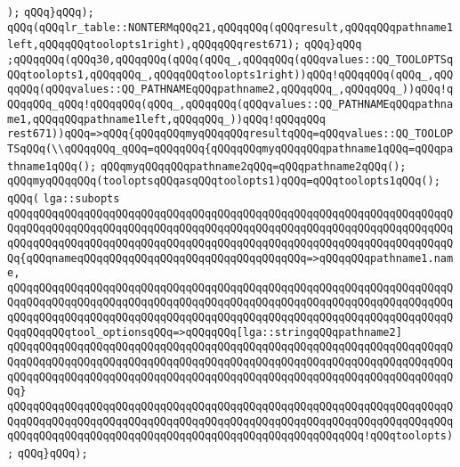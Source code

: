 \verb|);|\newline
\verb|qQQq}qQQq);|\newline
\verb|qQQq(qQQqlr_table::NONTERMqQQq21,qQQqqQQq(qQQqresult,qQQqqQQqpathname1left,qQQqqQQqtoolopts1right),qQQqqQQqrest671);|\newline
\verb|qQQq}qQQq|\newline
\verb|;qQQqqQQq(qQQq30,qQQqqQQq(qQQq(qQQq_,qQQqqQQq(qQQqvalues::QQ_TOOLOPTSqQQqtoolopts1,qQQqqQQq_,qQQqqQQqtoolopts1right))qQQq!qQQqqQQq(qQQq_,qQQqqQQq(qQQqvalues::QQ_PATHNAMEqQQqpathname2,qQQqqQQq_,qQQqqQQq_))qQQq!qQQqqQQq_qQQq!qQQqqQQq(qQQq_,qQQqqQQq(qQQqvalues::QQ_PATHNAMEqQQqpathname1,qQQqqQQqpathname1left,qQQqqQQq_))qQQq!qQQqqQQq|\newline
\verb|rest671))qQQq=>qQQq{qQQqqQQqmyqQQqqQQqresultqQQq=qQQqvalues::QQ_TOOLOPTSqQQq(\\qQQqqQQq_qQQq=qQQqqQQq{qQQqqQQqmyqQQqqQQqpathname1qQQq=qQQqpathname1qQQq();|\newline
\verb|qQQqmyqQQqqQQqpathname2qQQq=qQQqpathname2qQQq();|\newline
\verb|qQQqmyqQQqqQQq(tooloptsqQQqasqQQqtoolopts1)qQQq=qQQqtoolopts1qQQq();|\newline
\verb|qQQq(|\newline
\verb|lga::subopts|\newline
\verb|qQQqqQQqqQQqqQQqqQQqqQQqqQQqqQQqqQQqqQQqqQQqqQQqqQQqqQQqqQQqqQQqqQQqqQQqqQQqqQQqqQQqqQQqqQQqqQQqqQQqqQQqqQQqqQQqqQQqqQQqqQQqqQQqqQQqqQQqqQQqqQQqqQQqqQQqqQQqqQQqqQQqqQQqqQQqqQQqqQQqqQQqqQQqqQQqqQQqqQQqqQQqqQQqqQQq{qQQqnameqQQqqQQqqQQqqQQqqQQqqQQqqQQqqQQqqQQq=>qQQqqQQqpathname1.name,|\newline
\verb|qQQqqQQqqQQqqQQqqQQqqQQqqQQqqQQqqQQqqQQqqQQqqQQqqQQqqQQqqQQqqQQqqQQqqQQqqQQqqQQqqQQqqQQqqQQqqQQqqQQqqQQqqQQqqQQqqQQqqQQqqQQqqQQqqQQqqQQqqQQqqQQqqQQqqQQqqQQqqQQqqQQqqQQqqQQqqQQqqQQqqQQqqQQqqQQqqQQqqQQqqQQqqQQqqQQqqQQqqQQqtool_optionsqQQq=>qQQqqQQq[lga::stringqQQqpathname2]|\newline
\verb|qQQqqQQqqQQqqQQqqQQqqQQqqQQqqQQqqQQqqQQqqQQqqQQqqQQqqQQqqQQqqQQqqQQqqQQqqQQqqQQqqQQqqQQqqQQqqQQqqQQqqQQqqQQqqQQqqQQqqQQqqQQqqQQqqQQqqQQqqQQqqQQqqQQqqQQqqQQqqQQqqQQqqQQqqQQqqQQqqQQqqQQqqQQqqQQqqQQqqQQqqQQqqQQqqQQq}|\newline
\verb|qQQqqQQqqQQqqQQqqQQqqQQqqQQqqQQqqQQqqQQqqQQqqQQqqQQqqQQqqQQqqQQqqQQqqQQqqQQqqQQqqQQqqQQqqQQqqQQqqQQqqQQqqQQqqQQqqQQqqQQqqQQqqQQqqQQqqQQqqQQqqQQqqQQqqQQqqQQqqQQqqQQqqQQqqQQqqQQqqQQqqQQqqQQqqQQqqQQq!qQQqtoolopts);|\newline
\verb|qQQq}qQQq);|\newline
